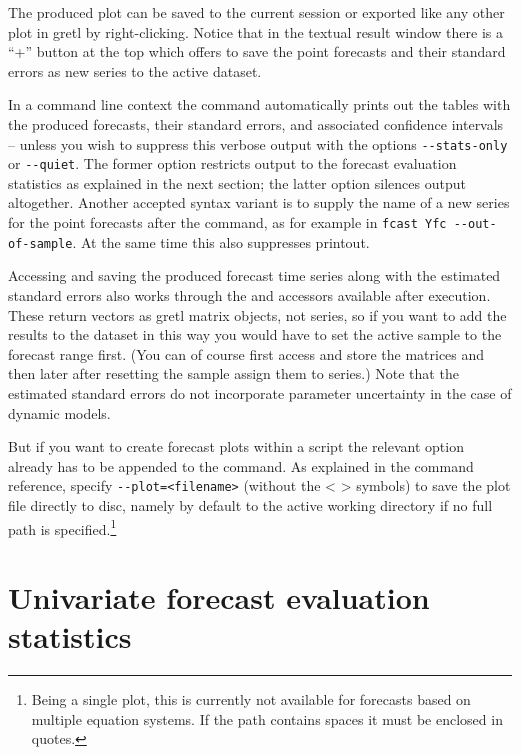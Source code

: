 The produced plot can be saved to the current session or exported like
any other plot in gretl by right-clicking. Notice that in the textual
result window there is a ``+'' button at the top which offers to save
the point forecasts and their standard errors as new series to the
active dataset. 

In a command line context the  command automatically prints 
out the tables with the produced forecasts, their standard errors, and 
associated confidence intervals -- unless you wish to suppress this 
verbose output with the options \verb|--stats-only| or \verb|--quiet|. 
The former option restricts output to the forecast evaluation statistics
as explained in the next section; the latter option silences output 
altogether. Another accepted syntax variant is to supply the name of a
new series for the point forecasts after the  command, as for
example in \verb|fcast Yfc --out-of-sample|. At the same time this also
suppresses printout. 

Accessing and saving the produced forecast time series along with the 
estimated standard errors also works through 
the  and  accessors available after 
 execution. These return vectors as gretl matrix objects, not
series, so if you want to add the results to the dataset in this way you
would have to set the active sample to the forecast range first. (You 
can of course first access and store the matrices and then later after 
resetting the sample assign them to series.) Note that the estimated 
standard errors do not incorporate parameter uncertainty in the case
of dynamic models.

But if you want to create forecast plots within a
script the relevant option already has to be appended to the 
command. As explained in the 
command reference, specify \verb|--plot=<filename>| (without the < > 
symbols) to save the plot file directly to disc, namely by default to 
the active working directory if no full path is specified.\footnote{%
Being a single plot, this is currently not available
for forecasts based on multiple equation systems. If the path contains
spaces it must be enclosed in quotes.} 

\section{Univariate forecast evaluation statistics}
\label{sec:fcast-stats}

